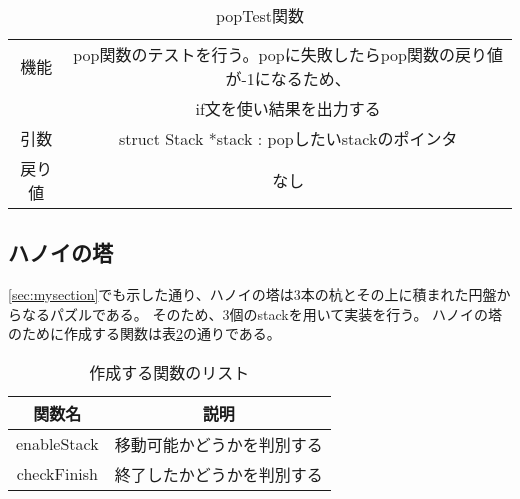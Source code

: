 \documentclass[a4paper,11pt]{jsarticle}
\begin{document}
\begin{table}[ht]
  \centering
  \begin{tabular}{|c|c|}
    \hline
    機能  & pop関数のテストを行う。popに失敗したらpop関数の戻り値が-1になるため、 \\ & if文を使い結果を出力する            \\
    \hline
    引数  & struct Stack *stack : popしたいstackのポインタ   \\
    \hline
    戻り値 & なし                                       \\
    \hline
  \end{tabular}
  \caption{popTest関数}
  \label{tab:poptest_func}
\end{table}
\newpage
\subsection{ハノイの塔}
\ref{sec:mysection}でも示した通り、ハノイの塔は3本の杭とその上に積まれた円盤からなるパズルである。
そのため、3個のstackを用いて実装を行う。
ハノイの塔のために作成する関数は表\ref{tab:hanoi_functions}の通りである。
\begin{table}[ht]
  \centering
  \begin{tabular}{|c|c|}
    \hline
    \textbf{関数名} & \textbf{説明}   \\
    \hline
    enableStack  & 移動可能かどうかを判別する \\
    \hline
    checkFinish  & 終了したかどうかを判別する \\
    \hline
  \end{tabular}
  \caption{作成する関数のリスト}
  \label{tab:hanoi_functions}
\end{table}
\end{document}
